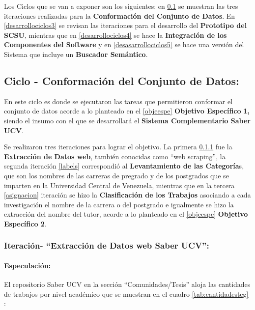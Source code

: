 \documentclass[
  12pt,
  openany]{book}
\begin{document}
Los Ciclos que se van a exponer son los siguientes: en \ref{desarrollociclos1} se muestran las tres iteraciones realizadas para la \textbf{Conformación del Conjunto de Datos}. En \ref{desarrollociclos3} se revisan las iteraciones para el desarrollo del \textbf{Prototipo del SCSU}, mientras que en \ref{desarrollociclos4} se hace la \textbf{Integración de los Componentes del Software} y en \ref{desasarrollociclos5} se hace una versión del Sistema que incluye un \textbf{Buscador Semántico}.

\hypertarget{desarrollociclos1}{%
\subsection{Ciclo - Conformación del Conjunto de Datos:}\label{desarrollociclos1}}

En este ciclo es donde se ejecutaron las tareas que permitieron conformar el conjunto de datos acorde a lo planteado en el \ref{objeespe} \textbf{Objetivo Específico} \textbf{1,} siendo el insumo con el que se desarrollará el \textbf{Sistema Complementario Saber UCV}.

Se realizaron tres iteraciones para lograr el objetivo. La primera \ref{scrapeo} fue la \textbf{Extracción de Datos web}, también conocidas como ``web scraping'', la segunda iteración \ref{labels} correspondió al \textbf{Levantamiento de las Categoría}s, que son los nombres de las carreras de pregrado y de los postgrados que se imparten en la Universidad Central de Venezuela, mientras que en la tercera \ref{asignacion} iteración se hizo la \textbf{Clasificación de los Trabajos} asociando a cada investigación el nombre de la carrera o del postgrado e igualmente se hizo la extracción del nombre del tutor, acorde a lo planteado en el \ref{objeespe} \textbf{Objetivo Específico 2}.

\hypertarget{scrapeo}{%
\subsubsection{Iteración- ``Extracción de Datos web Saber UCV'':}\label{scrapeo}}

\hypertarget{especulaciuxf3n-1}{%
\paragraph{Especulación:}\label{especulaciuxf3n-1}}

El repositorio Saber UCV en la sección ``Comunidades/Tesis'' aloja las cantidades de trabajos por nivel académico que se muestran en el cuadro \ref{tab:cantidadesteg} :
\end{document}
